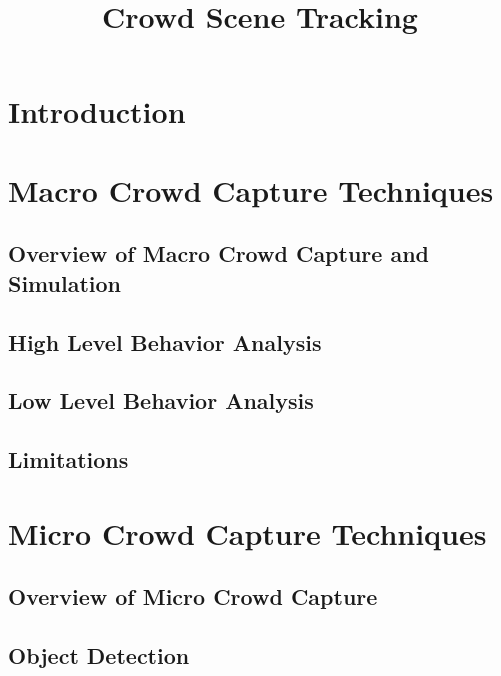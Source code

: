 \documentclass[conference]{IEEEtran}
\begin{document}
 
\title{Crowd Scene Tracking}

\author{
\and
{}
\and
{}
\and
{}
}

\maketitle

\section{Introduction}

\section{Macro Crowd Capture Techniques}

\subsection{Overview of Macro Crowd Capture and Simulation}

\subsection{High Level Behavior Analysis}

\subsection{Low Level Behavior Analysis}

\subsection{Limitations}

\section{Micro Crowd Capture Techniques}

\subsection{Overview of Micro Crowd Capture}

\subsection{Object Detection}
\end{document}
